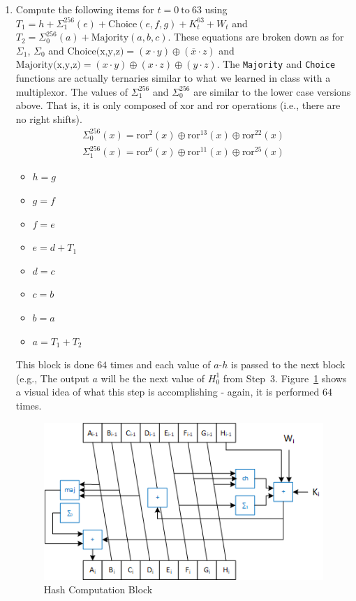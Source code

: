 \documentclass{article}
\begin{document}
\begin{enumerate}
    \item Compute the following items for $t = 0~\text{to}~63$ using      
      $T_1 = h + \Sigma_1^{256} (e) + \text{Choice}(e,f,g) + K_t^{63} + W_t$ and
      $T_2 = \Sigma_0^{256} (a) + \text{Majority}(a,b,c)$.  These 
      equations are broken down as for $\Sigma_1$, $\Sigma_0$
      and $\text{Choice(x,y,z)} = (x \cdot y) \oplus (\overline{x} \cdot z)$ and
      $\text{Majority(x,y,z)} = (x \cdot y) \oplus (x \cdot z) \oplus (y
      \cdot z)$.  The \verb!Majority! and \verb!Choice! functions are
      actually ternaries similar to what we learned in class with a
      multiplexor.
      The values of $\Sigma_1^{256}$ and $\Sigma_0^{256}$
      are similar to the lower case versions above.  That is, it
      is only composed of xor and ror operations (i.e., there are no right shifts).
      \begin{eqnarray*}
        \Sigma_0^{256}(x) = \text{ror}^{2}(x) \oplus \text{ror}^{13}(x) \oplus \text{ror}^{22}(x)    \\
        \Sigma_1^{256}(x) = \text{ror}^{6}(x) \oplus \text{ror}^{11}(x) \oplus \text{ror}^{25}(x)    
      \end{eqnarray*}
  \begin{itemize}
  \item $h = g$
  \item $g = f$
  \item $f = e$
  \item $e = d + T_1$
  \item $d = c$
  \item $c = b$
  \item $b = a$
  \item $a = T_1 + T_2$
  \end{itemize}
  This block is done $64$ times and each value of $a$-$h$ is passed to the
  next block (e.g., The output $a$ will be the next value of $H_0^1$
  from Step~$3$.  Figure~\ref{sha256compression.fig} shows a visual idea
  of what this step is accomplishing - again, it is performed $64$
  times.
  \begin{figure} [t!]
  \centering
  \includegraphics[scale=0.7]{sha256compression.png}
  \caption{Hash Computation Block}
  \label{sha256compression.fig}
  \end{figure}
  

\end{enumerate}
\end{document}

